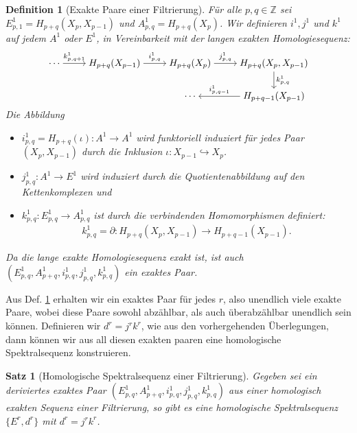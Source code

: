 \documentclass[12pt, hidelinks]{article}
\numberwithin{conj}{section}
\newtheorem{definition}[conj]{Definition}
\newtheorem{theorem}[conj]{Satz}
\newcommand{\Z}{\mathbb{Z}}
\begin{document}
\begin{definition}[Exakte Paare einer Filtrierung]
\label{exaktFiltration}
Für alle $p,q \in \Z$ sei $E^1_{p,1} = H_{p+q}(X_p,X_{p-1})$ und $A^1_{p,q} = H_{p+q}(X_p)$. Wir definieren $i^1,j^1$ und $k^1$ auf jedem $A^1$ oder $E^1$, in Vereinbarkeit mit der langen exakten Homologiesequenz:
\[\begin{tikzcd}[cramped]
	\cdots & {H_{p+q}(X_{p-1})} & {H_{p+q}(X_{p})} & {H_{p+q}(X_{p},X_{p-1})} \\
	& {} & \cdots & {H_{p+q-1}(X_{p-1})}
	\arrow["{k^1_{p,q+1}}", from=1-1, to=1-2]
	\arrow["{i^1_{p,q}}", from=1-2, to=1-3]
	\arrow["{j^1_{p,q}}", from=1-3, to=1-4]
	\arrow["{k^1_{p,q}}", from=1-4, to=2-4]
	\arrow["{i^1_{p,q-1}}"', from=2-4, to=2-3]
\end{tikzcd}\]
Die Abbildung
\begin{itemize}[nolistsep]
    \item $i^1_{p,q} = H_{p+q}(\iota): A^1 \to A^1$ wird funktoriell induziert für jedes Paar $(X_p,X_{p-1})$ durch die Inklusion $\iota: X_{p-1} \hookrightarrow X_p$.
    \item $j^1_{p,q}: A^1 \to E^1$ wird induziert durch die Quotientenabbildung auf den Kettenkomplexen und
    \item $k^1_{p,q}: E^1_{p,q} \to A^1_{p,q}$ ist durch die verbindenden Homomorphismen definiert:
    \begin{align}
        k^1_{p,q} = \partial: H_{p+q}(X_p,X_{p-1}) \to H_{p+q-1}(X_{p-1}).
    \end{align}
\end{itemize}
Da die lange exakte Homologiesequenz exakt ist, ist auch $(E^1_{p,q},A^1_{p+q},i^1_{p,q},j^1_{p,q},k^1_{p,q})$ ein exaktes Paar.
\end{definition}

Aus Def. \ref{exaktFiltration} erhalten wir ein exaktes Paar für jedes $r$, also unendlich viele exakte Paare, wobei diese Paare sowohl abzählbar, als auch überabzählbar unendlich sein können. Definieren wir $d^r = j^rk^r$, wie aus den vorhergehenden Überlegungen, dann können wir aus all diesen exakten paaren eine homologische Spektralsequenz konstruieren.

\begin{theorem}[Homologische Spektralsequenz einer Filtrierung]
Gegeben sei ein deriviertes exaktes Paar $(E^1_{p,q},A^1_{p+q},i^1_{p,q},j^1_{p,q},k^1_{p,q})$ aus einer homologisch exakten Sequenz einer Filtrierung, so gibt es eine homologische Spektralsequenz $\{E^r,d^r\}$ mit $d^r = j^rk^r$.
\end{theorem}
\end{document}
